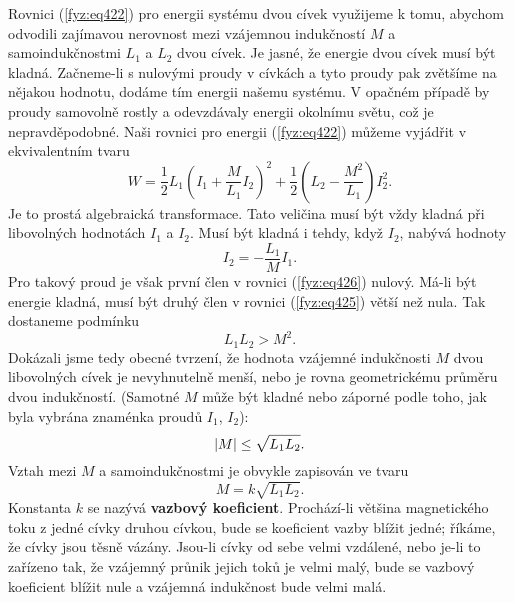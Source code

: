 {  Rovnici (\ref{fyz:eq422}) pro energii systému dvou cívek využijeme k tomu, abychom odvodili 
  zajímavou nerovnost mezi vzájemnou indukčností \(M\) a samoindukčnostmi \(L_1\) a \(L_2\) dvou 
  cívek. Je jasné, že energie dvou cívek musí být kladná. Začneme-li s nulovými proudy v cívkách a 
  tyto proudy pak zvětšíme na nějakou hodnotu, dodáme tím energii našemu systému. V opačném případě 
  by proudy samovolně rostly a odevzdávaly energii okolnímu světu, což je nepravděpodobné. Naši 
  rovnici pro energii (\ref{fyz:eq422}) můžeme vyjádřit v ekvivalentním tvaru
  \begin{equation}\label{fyz:eq425}
    W = \frac{1}{2}L_1\left(I_1+\frac{M}{L_1}I_2\right)^2 + 
        \frac{1}{2}\left(L_2-\frac{M^2}{L_1}\right)I_2^2.
  \end{equation}
  Je to prostá algebraická transformace. Tato veličina musí být vždy kladná při libovolných 
  hodnotách \(I_1\) a \(I_2\). Musí být kladná i tehdy, když \(I_2\), nabývá hodnoty
  \begin{equation}\label{fyz:eq426}
    I_2 = - \frac{L_1}{M}I_1.
  \end{equation}
  Pro takový proud je však první člen v rovnici (\ref{fyz:eq426}) nulový. Má-li být energie kladná, 
  musí být druhý člen v rovnici (\ref{fyz:eq425}) větší než nula. Tak dostaneme podmínku
  \begin{equation}\label{fyz:eq427}
    L_1L_2 >M^2.
  \end{equation}
  Dokázali jsme tedy obecné tvrzení, že hodnota vzájemné indukčnosti \(M\) dvou libovolných cívek
  je nevyhnutelně menší, nebo je rovna geometrickému průměru dvou indukčností. (Samotné \(M\) může 
  být kladné nebo záporné podle toho, jak byla vybrána znaménka proudů \(I_1\), \(I_2\)):
  \begin{equation}\label{fyz:eq428}
    \lvert M\rvert\leq \sqrt{L_1L_2}.
  \end{equation}
  Vztah mezi \(M\) a samoindukčnostmi je obvykle zapisován ve tvaru
  \begin{equation}\label{fyz:eq429}
    M =  k\sqrt{L_1L_2}.
  \end{equation}
  Konstanta \(k\) se nazývá \textbf{vazbový koeficient}. Prochází-li většina magnetického toku z 
  jedné cívky druhou cívkou, bude se koeficient vazby blížit jedné; říkáme, že cívky jsou těsně 
  vázány. Jsou-li cívky od sebe velmi vzdálené, nebo je-li to zařízeno tak, že vzájemný průnik 
  jejich toků je velmi malý, bude se vazbový koeficient blížit nule a vzájemná indukčnost bude 
  velmi malá. 
  
}
